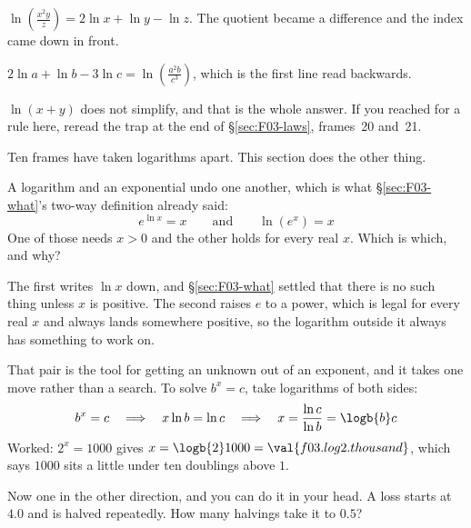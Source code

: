 \begin{fr}
\begin{ansblock}
$\ln\!\left(\frac{x^{2} y}{z}\right) = 2\ln x + \ln y - \ln z$. The quotient
became a difference and the index came down in front.

$2\ln a + \ln b - 3\ln c = \ln\!\left(\frac{a^{2} b}{c^{3}}\right)$, which is
the first line read backwards.

$\ln(x + y)$ does not simplify, and that is the whole answer. If you reached
for a rule here, reread the trap at the end of \S\ref{sec:F03-laws}, frames~20
and~21.
\end{ansblock}

Ten frames have taken logarithms apart. This section does the other thing.

A logarithm and an exponential undo one another, which is what
\S\ref{sec:F03-what}'s two-way definition already said:
\[ e^{\ln x} = x \qquad \text{and} \qquad \ln\!\left(e^{x}\right) = x \]
One of those needs $x > 0$ and the other holds for every real $x$. Which is
which, and why?
\nextframe
\end{fr}

\begin{fr}
The first writes $\ln x$ down, and \S\ref{sec:F03-what} settled that there is
no such thing unless $x$ is positive. The second raises $e$ to a power, which
is legal for every real $x$ and always lands somewhere positive, so the
logarithm outside it always has something to work on.

That pair is the tool for getting an unknown out of an exponent, and it takes
one move rather than a search. To solve $b^{x} = c$, take logarithms of both
sides:
\[ b^{x} = c \quad\Longrightarrow\quad x \ln b = \ln c
   \quad\Longrightarrow\quad x = \frac{\ln c}{\ln b} = \logb{b} c \]
Worked: $2^{x} = 1000$ gives $x = \logb{2} 1000 = \val{f03.log2.thousand}$,
which says $1000$ sits a little under ten doublings above $1$.

Now one in the other direction, and you can do it in your head. A loss starts
at $\num{4.0}$ and is halved repeatedly. How many halvings take it to
$\num{0.5}$?
\nextframe
\end{fr}

